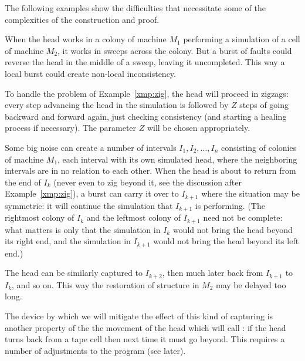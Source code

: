 \documentclass[11pt]{memoir}
\theoremstyle{definition} %
\newcommand{\Z}{Z}
\begin{document}
The following examples show the difficulties that necessitate some of the complexities of the
construction and proof.

\begin{example}\label{xmp:zig}
  When the head works in a colony of machine \( M_{1} \) performing a simulation of a cell of machine \( M_{2} \),
  it works in sweeps across the colony.
  But a burst of faults could reverse the head in the middle of a sweep, leaving it uncompleted.
  This way a local burst could create non-local inconsistency.
\end{example}

To handle the problem of Example~\ref{xmp:zig}, the head will proceed in zigzags: every
  step advancing the head in the simulation
  is followed by \( \Z \) steps of going backward and forward again, just checking consistency
  (and starting a healing process if necessary).
  The parameter \( \Z \) will be chosen appropriately.

\begin{example}\label{xmp:feather}
  Some big noise can create a number of intervals \( I_{1},I_{2},\dots,I_{n} \)
  consisting of colonies of machine \( M_{1} \), each interval with its own simulated head,
  where the neighboring intervals are in no relation to each other.
  When the head is about to return from the end of \( I_{k} \)
  (never even to zig beyond it, see the discussion after Example~\ref{xmp:zig}),
  a burst can carry it over to \( I_{k+1} \) where
  the situation may be symmetric: it will continue the simulation that \( I_{k+1} \) is performing.
  (The rightmost colony of \( I_{k} \) and the leftmost colony of \( I_{k+1} \) need not be complete:
  what matters is only that the simulation in \( I_{k} \) would not bring the head beyond its right end,
  and the simulation in \( I_{k+1} \) would not bring the head beyond its left end.)

  The head can be similarly captured to \( I_{k+2} \), then much later back from \( I_{k+1} \) to \( I_{k} \),
  and so on.
  This way the restoration of structure in \( M_{2} \) may be delayed too long.
\end{example}

The device by which we will mitigate the effect of this kind of capturing is another property of the
the movement of the head which will call :
if the head turns back from a tape cell then next time it must go beyond.
This requires a number of adjustments to the program (see later).
\end{document}

